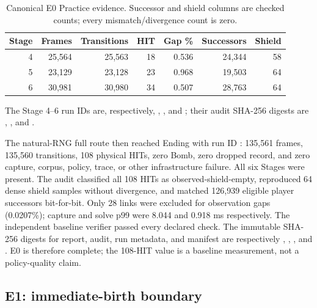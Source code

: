 \documentclass[11pt]{article}
\begin{document}
\begin{table}[ht]
\centering
\small
\begin{tabular}{@{}rrrrrrr@{}}
\toprule
Stage & Frames & Transitions & HIT & Gap \% & Successors & Shield \\
\midrule
4 & 25,564 & 25,563 & 18 & 0.536 & 24,344 & 58 \\
5 & 23,129 & 23,128 & 23 & 0.968 & 19,503 & 64 \\
6 & 30,981 & 30,980 & 34 & 0.507 & 28,763 & 64 \\
\bottomrule
\end{tabular}
\caption{Canonical E0 Practice evidence.  Successor and shield columns are
checked counts; every mismatch/divergence count is zero.}
\label{tab:e0-practice}
\end{table}

The Stage 4--6 run IDs are, respectively,
,
, and
; their audit SHA-256 digests are
,
,
and
.

The natural-RNG full route then reached Ending with run ID
: 135,561 frames, 135,560 transitions,
108 physical HITs, zero Bomb, zero dropped record, and zero capture, corpus,
policy, trace, or other infrastructure failure.  All six Stages were present.
The audit classified all 108 HITs as observed-shield-empty, reproduced 64 dense
shield samples without divergence, and matched 126,939 eligible player
successors bit-for-bit.  Only 28 links were excluded for observation gaps
(0.0207\%); capture and solve p99 were 8.044 and 0.918 ms respectively.  The
independent baseline verifier passed every declared check.  The immutable
SHA-256 digests for report, audit, run metadata, and manifest are respectively
,
,
,
and
.
E0 is therefore complete; the 108-HIT value is a baseline measurement, not a
policy-quality claim.

\subsection{E1: immediate-birth boundary}
\end{document}
